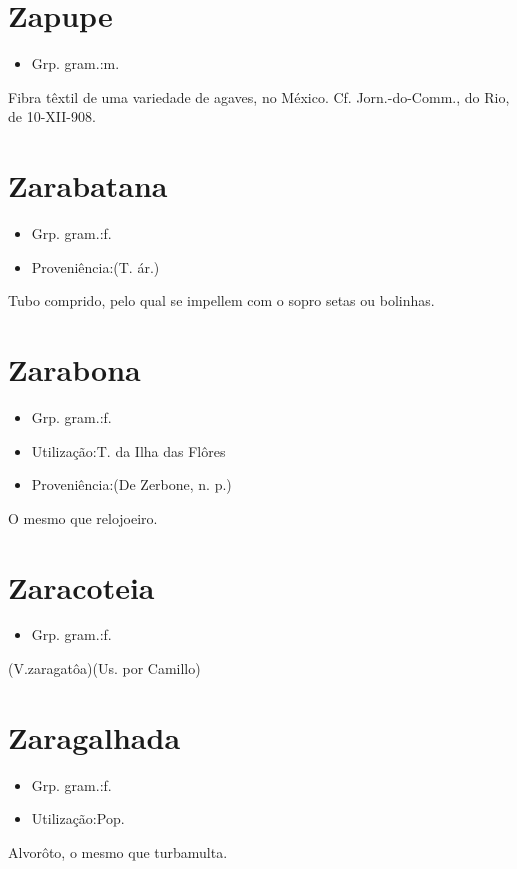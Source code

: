 \section{Zapupe}
\begin{itemize}
\item {Grp. gram.:m.}
\end{itemize}
Fibra têxtil de uma variedade de agaves, no México. Cf. \textunderscore Jorn.-do-Comm.\textunderscore , do Rio, de 10-XII-908.
\section{Zarabatana}
\begin{itemize}
\item {Grp. gram.:f.}
\end{itemize}
\begin{itemize}
\item {Proveniência:(T. ár.)}
\end{itemize}
Tubo comprido, pelo qual se impellem com o sopro setas ou bolinhas.
\section{Zarabona}
\begin{itemize}
\item {Grp. gram.:f.}
\end{itemize}
\begin{itemize}
\item {Utilização:T. da Ilha das Flôres}
\end{itemize}
\begin{itemize}
\item {Proveniência:(De \textunderscore Zerbone\textunderscore , n. p.)}
\end{itemize}
O mesmo que \textunderscore relojoeiro\textunderscore .
\section{Zaracoteia}
\begin{itemize}
\item {Grp. gram.:f.}
\end{itemize}
(V.zaragatôa)(Us. por Camillo)
\section{Zaragalhada}
\begin{itemize}
\item {Grp. gram.:f.}
\end{itemize}
\begin{itemize}
\item {Utilização:Pop.}
\end{itemize}
Alvorôto, o mesmo que \textunderscore turbamulta\textunderscore .
